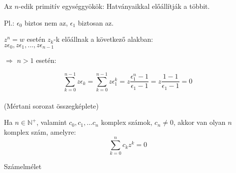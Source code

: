 \begin{frame}
\begin{tcolorbox}[title={Def.: $n$-edik primitív egységgyökök}]
Az $n$-edik primitív egységgyökök: Hatványaikkal előállítják a többit.\\
\mmedskip

Pl.: ${\epsilon}_0$ biztos nem az, ${\epsilon}_1$ biztosan az.\\
\mmedskip

$z^n = w$ esetén $z_k$-k előállnak a következő alakban:\\
$z{\epsilon}_0, z{\epsilon}_1, ..., z{\epsilon}_{n - 1}$\\
\mmedskip

$\Rightarrow$ $n > 1$ esetén:\\
\mmedskip

$$\sum_{k = 0}^{n - 1} z{\epsilon}_k = \sum_{k = 0}^{n - 1} z{\epsilon}^k_1 = z\frac{{\epsilon}_1^n - 1}{{\epsilon}_1 - 1} = z\frac{1 - 1}{{\epsilon}_1 - 1} = 0$$\\
(Mértani sorozat összegképlete)
\end{tcolorbox}
\end{frame}

\begin{frame}
\begin{tcolorbox}[title={Tétel: Az algebra alaptétele}]
Ha $n \in \mathbb{N}^+$, valamint $c_0, c_1, ... c_n$ komplex számok, $c_n \neq 0$, akkor van olyan $n$ komplex szám, amelyre:\\
$$\sum_{k = 0}^n c_kz^k = 0$$
\end{tcolorbox}
\end{frame}

\begin{frame}[plain]
\begin{tcolorbox}[center, colback={myyellow}, coltext={black}, colframe={myyellow}]
    {\Huge Számelmélet}
    \mmedskip
\end{tcolorbox}
\end{frame}

